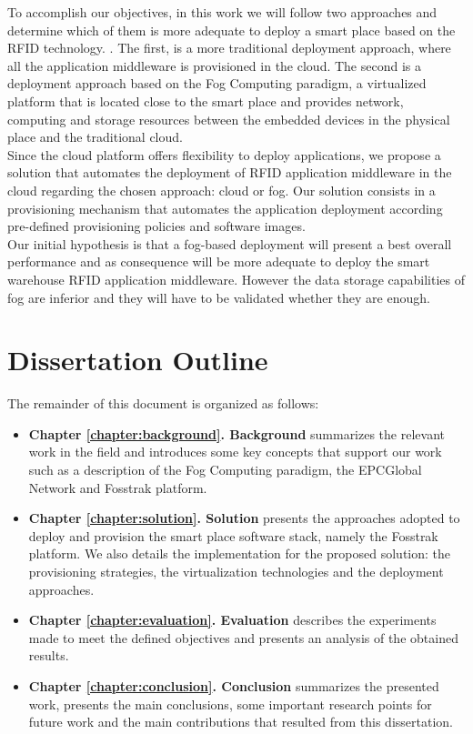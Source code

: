 To accomplish our objectives, in this work we will follow two approaches and determine which of them
is more adequate to deploy a smart place based on the \gls{RFID} technology. . The first, is a
more traditional deployment approach, where all the application middleware is provisioned in the cloud.
The second is a deployment approach based on the Fog Computing\cite{bonomi2012fog} paradigm,
a virtualized platform that is located close to the smart place and provides network, computing
and storage resources between the embedded devices in the physical place and the traditional cloud.\\

Since the cloud platform offers flexibility to deploy applications, we propose a solution that
automates the deployment of \gls{RFID} application middleware in the cloud regarding the chosen approach:
cloud or fog. Our solution consists in a provisioning mechanism that automates the application
deployment according pre-defined provisioning policies and software images.\\

Our initial hypothesis is that a fog-based deployment will present a best overall performance and as
consequence will be more adequate to deploy the smart warehouse \gls{RFID} application middleware.
However the data storage capabilities of fog are inferior and they will have to be
validated whether they are enough.

\section{Dissertation Outline}
\label{section:outline}
The remainder of this document is organized as follows:
\begin{itemize}
  \item \textbf{Chapter \ref{chapter:background}. Background} summarizes the relevant work in the field and
  introduces some key concepts that support our work such as a description of the Fog Computing paradigm,
  the EPCGlobal Network and Fosstrak platform.
  \item \textbf{Chapter \ref{chapter:solution}. Solution} presents the approaches adopted to deploy
  and provision the smart place software stack, namely the Fosstrak platform. We also details the implementation
  for the proposed solution: the provisioning strategies, the virtualization technologies and the
  deployment approaches.
  \item \textbf{Chapter \ref{chapter:evaluation}. Evaluation} describes the experiments made to meet
  the defined objectives and presents an analysis of the obtained results.
  \item \textbf{Chapter \ref{chapter:conclusion}. Conclusion} summarizes the presented work,
  presents the main conclusions, some important research points for future work and the main contributions
  that resulted from this dissertation.
\end{itemize}
